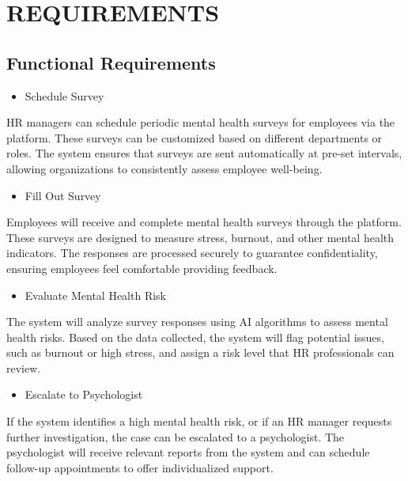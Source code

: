 \documentclass[conference]{IEEEtran}
\begin{document}
\section{REQUIREMENTS}

\subsection{Functional Requirements}

\begin{itemize}
\item Schedule Survey
\end{itemize}

HR managers can schedule periodic mental health surveys
for employees via the platform. These surveys can be
customized based on different departments or roles. The
system ensures that surveys are sent automatically at pre-set
intervals, allowing organizations to consistently assess
employee well-being.
\newline
\begin{itemize}
    \item Fill Out Survey
    \end{itemize}
    
Employees will receive and complete mental health
surveys through the platform. These surveys are designed to
measure stress, burnout, and other mental health indicators.
The responses are processed securely to guarantee
confidentiality, ensuring employees feel comfortable
providing feedback.%
\newline

\par
\begin{itemize}
    \item Evaluate Mental Health Risk
    \end{itemize}
    
    The system will analyze survey responses using AI
    algorithms to assess mental health risks. Based on the data
    collected, the system will flag potential issues, such as burnout
    or high stress, and assign a risk level that HR professionals can
    review.
    \newline

\begin{itemize}
        \item Escalate to Psychologist
        \end{itemize}
        
        If the system identifies a high mental health risk, or if an
        HR manager requests further investigation, the case can be
        escalated to a psychologist. The psychologist will receive
        relevant reports from the system and can schedule follow-up
        appointments to offer individualized support.
        \newline
\end{document}
